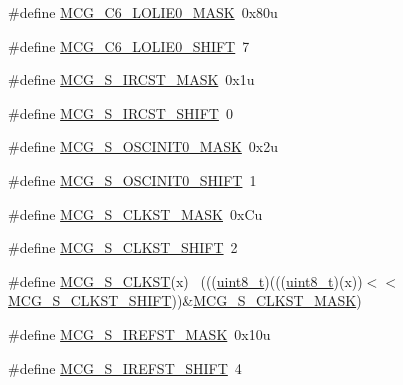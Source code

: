 \begin{DoxyCompactItemize}
\item 
\#define \hyperlink{group___m_c_g___register___masks_ga0b0e7ca112d81e86d413c014d144fd8d}{M\+C\+G\+\_\+\+C6\+\_\+\+L\+O\+L\+I\+E0\+\_\+\+M\+A\+SK}~0x80u
\item 
\#define \hyperlink{group___m_c_g___register___masks_gaf62eb94fa38802a5950bd616b539a69c}{M\+C\+G\+\_\+\+C6\+\_\+\+L\+O\+L\+I\+E0\+\_\+\+S\+H\+I\+FT}~7
\item 
\#define \hyperlink{group___m_c_g___register___masks_ga1c693472984fb69650b117ffe5b76da5}{M\+C\+G\+\_\+\+S\+\_\+\+I\+R\+C\+S\+T\+\_\+\+M\+A\+SK}~0x1u
\item 
\#define \hyperlink{group___m_c_g___register___masks_ga9abb1ad8f00a085572bb58ab815b7afd}{M\+C\+G\+\_\+\+S\+\_\+\+I\+R\+C\+S\+T\+\_\+\+S\+H\+I\+FT}~0
\item 
\#define \hyperlink{group___m_c_g___register___masks_ga75a97c37fbe3689889ea81fd04f13805}{M\+C\+G\+\_\+\+S\+\_\+\+O\+S\+C\+I\+N\+I\+T0\+\_\+\+M\+A\+SK}~0x2u
\item 
\#define \hyperlink{group___m_c_g___register___masks_ga3680bc3a628991bb5279d9d6b938b374}{M\+C\+G\+\_\+\+S\+\_\+\+O\+S\+C\+I\+N\+I\+T0\+\_\+\+S\+H\+I\+FT}~1
\item 
\#define \hyperlink{group___m_c_g___register___masks_gaf43507c78cdda211a04b5ae0509edb2e}{M\+C\+G\+\_\+\+S\+\_\+\+C\+L\+K\+S\+T\+\_\+\+M\+A\+SK}~0x\+Cu
\item 
\#define \hyperlink{group___m_c_g___register___masks_gab0768a667adb2dc2e1fb7972f9fd85a4}{M\+C\+G\+\_\+\+S\+\_\+\+C\+L\+K\+S\+T\+\_\+\+S\+H\+I\+FT}~2
\item 
\#define \hyperlink{group___m_c_g___register___masks_gabb753abc57dbb658ff413c418d8b68c8}{M\+C\+G\+\_\+\+S\+\_\+\+C\+L\+K\+ST}(x)                                                  ~(((\hyperlink{_p_e___types_8h_aba7bc1797add20fe3efdf37ced1182c5}{uint8\+\_\+t})(((\hyperlink{_p_e___types_8h_aba7bc1797add20fe3efdf37ced1182c5}{uint8\+\_\+t})(x))$<$$<$\hyperlink{group___m_c_g___register___masks_gab0768a667adb2dc2e1fb7972f9fd85a4}{M\+C\+G\+\_\+\+S\+\_\+\+C\+L\+K\+S\+T\+\_\+\+S\+H\+I\+FT}))\&\hyperlink{group___m_c_g___register___masks_gaf43507c78cdda211a04b5ae0509edb2e}{M\+C\+G\+\_\+\+S\+\_\+\+C\+L\+K\+S\+T\+\_\+\+M\+A\+SK})
\item 
\#define \hyperlink{group___m_c_g___register___masks_ga5bf822a90d9c1e67d5297420157e1dd0}{M\+C\+G\+\_\+\+S\+\_\+\+I\+R\+E\+F\+S\+T\+\_\+\+M\+A\+SK}~0x10u
\item 
\#define \hyperlink{group___m_c_g___register___masks_ga4a2727883c339845e709dacc0c2fd71a}{M\+C\+G\+\_\+\+S\+\_\+\+I\+R\+E\+F\+S\+T\+\_\+\+S\+H\+I\+FT}~4
$$
\end{DoxyCompactItemize}
